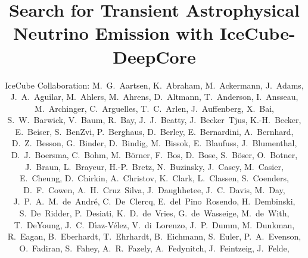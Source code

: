 \documentclass[manuscript]{aastex}
\begin{document}
\title{Search for Transient Astrophysical Neutrino Emission with IceCube-DeepCore}

\author{
IceCube Collaboration:
M.~G.~Aartsen,
K.~Abraham,
M.~Ackermann,
J.~Adams,
J.~A.~Aguilar,
M.~Ahlers,
M.~Ahrens,
D.~Altmann,
T.~Anderson,
I.~Ansseau,
M.~Archinger,
C.~Arguelles,
T.~C.~Arlen,
J.~Auffenberg,
X.~Bai,
S.~W.~Barwick,
V.~Baum,
R.~Bay,
J.~J.~Beatty,
J.~Becker~Tjus,
K.-H.~Becker,
E.~Beiser,
S.~BenZvi,
P.~Berghaus,
D.~Berley,
E.~Bernardini,
A.~Bernhard,
D.~Z.~Besson,
G.~Binder,
D.~Bindig,
M.~Bissok,
E.~Blaufuss,
J.~Blumenthal,
D.~J.~Boersma,
C.~Bohm,
M.~B\"orner,
F.~Bos,
D.~Bose,
S.~B\"oser,
O.~Botner,
J.~Braun,
L.~Brayeur,
H.-P.~Bretz,
N.~Buzinsky,
J.~Casey,
M.~Casier,
E.~Cheung,
D.~Chirkin,
A.~Christov,
K.~Clark,
L.~Classen,
S.~Coenders,
D.~F.~Cowen,
A.~H.~Cruz~Silva,
J.~Daughhetee,
J.~C.~Davis,
M.~Day,
J.~P.~A.~M.~de~Andr\'e,
C.~De~Clercq,
E.~del~Pino~Rosendo,
H.~Dembinski,
S.~De~Ridder,
P.~Desiati,
K.~D.~de~Vries,
G.~de~Wasseige,
M.~de~With,
T.~DeYoung,
J.~C.~D{\'\i}az-V\'elez,
V.~di~Lorenzo,
J.~P.~Dumm,
M.~Dunkman,
R.~Eagan,
B.~Eberhardt,
T.~Ehrhardt,
B.~Eichmann,
S.~Euler,
P.~A.~Evenson,
O.~Fadiran,
S.~Fahey,
A.~R.~Fazely,
A.~Fedynitch,
J.~Feintzeig,
J.~Felde,
}
\end{document}
